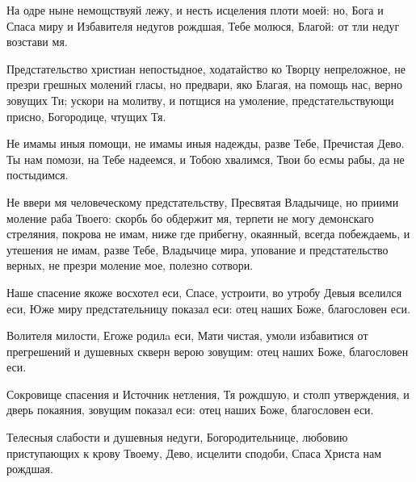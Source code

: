 \begin{mymulticols}
\inyne

На одре ныне немощствуяй лежу, и несть исцеления плоти моей: но, Бога и Спаса миру и Избавителя недугов рождшая, Тебе молюся, Благой: от тли недуг возстави мя.


Предстательство христиан непостыдное, ходатайство ко Творцу непреложное, не презри грешных молений гласы, но предвари, яко Благая, на помощь нас, верно зовущих Ти; ускори на молитву, и потщися на умоление, предстательствующи присно, Богородице, чтущих Тя.


Не имамы иныя помощи, не имамы иныя надежды, разве Тебе, Пречистая Дево. Ты нам помози, на Тебе надеемся, и Тобою хвалимся, Твои бо есмы рабы, да не постыдимся.


Не ввери мя человеческому предстательству, Пресвятая Владычице, но приими моление раба Твоего: скорбь бо обдержит мя, терпети не могу демонскаго стреляния, покрова не имам, ниже где прибегну, окаянный, всегда побеждаемь, и утешения не имам, разве Тебе, Владычице мира, упование и предстательство верных, не презри моление мое, полезно сотвори.




Наше спасение якоже восхотел еси, Спасе, устроити, во утробу Девыя вселился еси, Юже миру предстательницу показал еси: отец наших Боже, благословен еси.


Волителя милости, Егоже родилa еси, Мати чистая, умоли избавитися от прегрешений и душевных скверн верою зовущим: отец наших Боже, благословен еси.

\slava

Сокровище спасения и Источник нетления, Тя рождшую, и столп утверждения, и дверь покаяния, зовущим показал еси: отец наших Боже, благословен еси.

\inyne

Телесныя слабости и душевныя недуги, Богородительнице, любовию приступающих к крову Твоему, Дево, исцелити сподоби, Спаса Христа нам рождшая.


\end{mymulticols}
